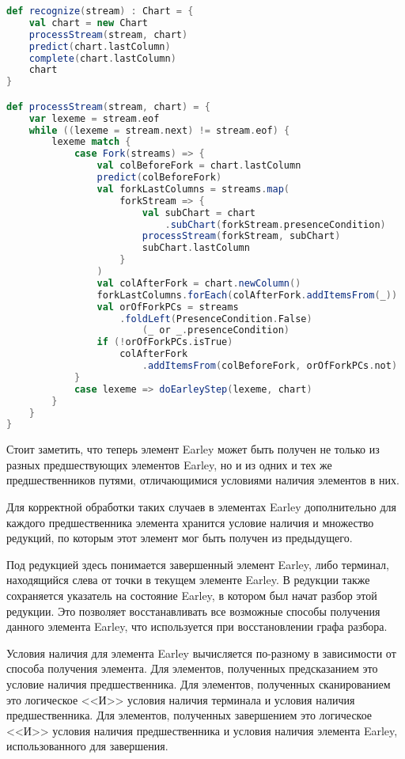 \begin{minipage}{\linewidth}
\begin{lstlisting}[caption={Псевдокод алгоритма распознавания},language=Scala,label=recognitionpseudocode]
def recognize(stream) : Chart = {
	val chart = new Chart
	processStream(stream, chart)
	predict(chart.lastColumn)
	complete(chart.lastColumn)
	chart
}

def processStream(stream, chart) = {
	var lexeme = stream.eof
	while ((lexeme = stream.next) != stream.eof) {
		lexeme match {
			case Fork(streams) => {
				val colBeforeFork = chart.lastColumn
				predict(colBeforeFork)
				val forkLastColumns = streams.map(
					forkStream => {
						val subChart = chart
							.subChart(forkStream.presenceCondition)
						processStream(forkStream, subChart)
						subChart.lastColumn
					}
				)
				val colAfterFork = chart.newColumn()
				forkLastColumns.forEach(colAfterFork.addItemsFrom(_))
				val orOfForkPCs = streams
					.foldLeft(PresenceCondition.False) 
						(_ or _.presenceCondition)
				if (!orOfForkPCs.isTrue) 
					colAfterFork
						.addItemsFrom(colBeforeFork, orOfForkPCs.not)
			}
			case lexeme => doEarleyStep(lexeme, chart)
		}
	}
}
\end{lstlisting}
\end{minipage}

Стоит заметить, что теперь элемент Earley может быть получен не только из разных предшествующих элементов Earley, но и из одних и тех же предшественников путями, отличающимися условиями наличия элементов в них.

Для корректной обработки таких случаев в элементах Earley дополнительно для каждого предшественника элемента хранится условие наличия и множество редукций, по которым этот элемент мог быть получен из предыдущего.

Под редукцией здесь понимается завершенный элемент Earley, либо терминал, находящийся слева от точки в текущем элементе Earley. В редукции также сохраняется указатель на состояние Earley, в котором был начат разбор этой редукции. Это позволяет восстанавливать все возможные способы получения данного элемента Earley, что используется при восстановлении графа разбора.

Условия наличия для элемента Earley вычисляется по-разному в зависимости от способа получения элемента. Для элементов, полученных предсказанием это условие наличия предшественника. Для элементов, полученных сканированием это логическое <<И>> условия наличия терминала и условия наличия предшественника. Для элементов, полученных завершением это логическое <<И>> условия наличия предшественника и условия наличия элемента Earley, использованного для завершения.

